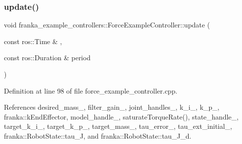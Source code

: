 \subsubsection{\texorpdfstring{update()}{update()}}
{\footnotesize\ttfamily void franka\+\_\+example\+\_\+controllers\+::\+Force\+Example\+Controller\+::update (\begin{DoxyParamCaption}\item[{const ros\+::\+Time \&}]{,  }\item[{const ros\+::\+Duration \&}]{period }\end{DoxyParamCaption})\hspace{0.3cm}{\ttfamily [override]}}



Definition at line 98 of file force\+\_\+example\+\_\+controller.\+cpp.



References desired\+\_\+mass\+\_\+, filter\+\_\+gain\+\_\+, joint\+\_\+handles\+\_\+, k\+\_\+i\+\_\+, k\+\_\+p\+\_\+, franka\+::k\+End\+Effector, model\+\_\+handle\+\_\+, saturate\+Torque\+Rate(), state\+\_\+handle\+\_\+, target\+\_\+k\+\_\+i\+\_\+, target\+\_\+k\+\_\+p\+\_\+, target\+\_\+mass\+\_\+, tau\+\_\+error\+\_\+, tau\+\_\+ext\+\_\+initial\+\_\+, franka\+::\+Robot\+State\+::tau\+\_\+J, and franka\+::\+Robot\+State\+::tau\+\_\+\+J\+\_\+d.


